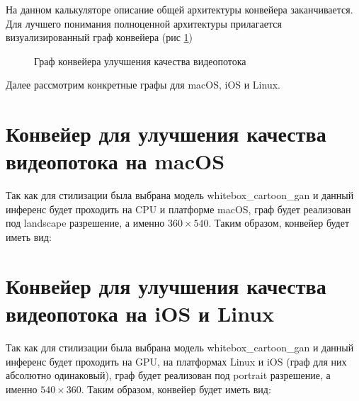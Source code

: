 \documentclass[a4paper,14pt]{extreport}
\begin{document}
        На данном калькуляторе описание общей архитектуры конвейера заканчивается. Для лучшего понимания полноценной архитектуры прилагается визуализированный граф конвейера (рис \ref{ris:graph})
        \begin{figure}[!h]
            \caption{Граф конвейера улучшения качества видеопотока}
            \label{ris:graph}
        \end{figure}
        Далее рассмотрим конкретные графы для macOS, iOS и Linux.
        
        \section{Конвейер для улучшения качества видеопотока на macOS}
        Так как для стилизации была выбрана модель whitebox\_cartoon\_gan и данный инференс будет проходить на CPU и платформе macOS, граф будет реализован под landscape разрешение, а именно $360 \times 540$. Таким образом, конвейер будет иметь вид:
        

        \section{Конвейер для улучшения качества видеопотока на iOS и Linux}
        Так как для стилизации была выбрана модель whitebox\_cartoon\_gan и данный инференс будет проходить на GPU, на платформах Linux и iOS (граф для них абсолютно одинаковый), граф будет реализован под portrait разрешение, а именно $540 \times 360$. Таким образом, конвейер будет иметь вид:
        
    
\end{document}
